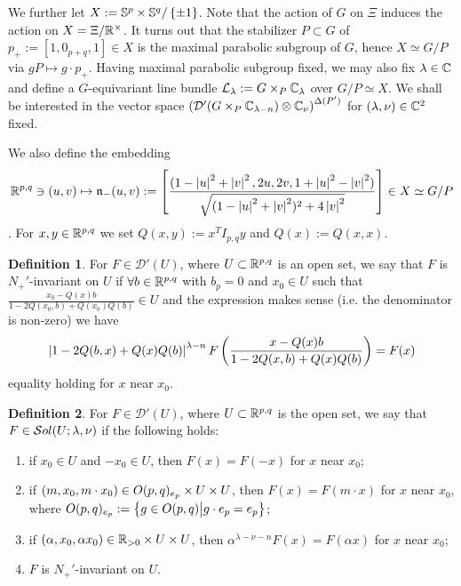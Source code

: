 \documentclass[10pt]{article} %
\newcommand{\D}{\mathcal{D}}
\theoremstyle{definition}
\newtheorem{mydef}{Definition}[section]
\theoremstyle{remark}
\newtheorem*{remark}{Remark}
\begin{document}
We further let $X:=\Sp^p\times\Sp^q/\left\{ \pm1 \right\}$. Note that the action of $G$
on $\Xi$ induces the action on $X=\Xi/\R^\times$. It turns out that the stabilizer $P\subset G$ of $p_+:=[1,0_{p+q},1]\in X$
is the maximal parabolic subgroup of $G$, hence $X\simeq G/P$ via $gP\mapsto g\cdot p_+$. Having maximal parabolic subgroup
fixed, we may also fix $\lambda\in\C$ and define a $G$-equivariant line bundle
$\mathcal{L}_{\lambda}:=G\times_P\C_\lambda$ over $G/P\simeq X$. We shall be interested
in the vector space $\mybra{\D'(G\times_P\C_{\lambda-n} )\otimes\C_\nu}^{\Delta(P')}$ for $(\lambda,\nu)\in\C^2$ fixed.

We also define the embedding \[\R^{ p,q }\ni(u,v)\mapsto \mathfrak{n}_-(u,v):=\mysbra{\frac{
	(1-\myabs{ u }^2+\myabs{ v }^2,2u,2v,1+\myabs{ u }^2
-\myabs{ v }^2)}{\sqrt{(1-\myabs{u}^2+\myabs{v}^2)^2+4\myabs{v}^2}}}\in X\simeq G/P\].
	For $x,y\in\R^{ p,q }$
	we set $Q(x,y):=x^TI_{ p,q }y$ and $Q(x):=Q(x,x)$.
\begin{mydef}
 For $F\in\D'(U)$, where $U\subset\R^{ p,q }$ is an open set, we say that
	$F$ is $N_+'$-invariant on $U$ if 
	$\forall b\in\R^{ p,q }$ with $b_p=0$ and $x_0\in U$ such that
	$\frac{ x_0-Q(x)b }{ 1-2Q(x_0,b)+Q(x_0)Q(b) }\in U$ and the expression makes sense (i.e. 
	the denominator is non-zero) we have \[\myabs{ 1-2Q(b,x)+Q(x)Q(b) }^{ \lambda-n }F
	\mybra{\frac{ x-Q(x)b }{ 1-2Q(x,b)+Q(x)Q(b)}}=F(x)\] equality holding for $x$ near $x_0$.
\end{mydef}
\begin{mydef}
		 For $F\in\D'(U)$, where $U\subset\R^{ p,q }$ is the open set,
			we say that $F\in\sol[U]$ if the following holds:
			\begin{enumerate}
				\item if $x_0\in U$ and $-x_0\in U$, then $F(x)=F(-x)$ for $x$ near $x_0$;
				\item if $(m,x_0,m\cdot x_0)\in \Stab\times U\times U$, then $F(x)=F(m\cdot x)$ for
					$x$ near $x_0$, where $\Stab:=\mysetn{g\in O(p,q)}{g\cdot e_p=e_p}$;
				\item if $(\alpha,x_0,\alpha x_0)\in \R_{>0}\times U\times U$, then $\alpha^{
					\lambda-\nu-n}F(x)=F(\alpha x)$ for $x$ near $x_0$;
				\item $F$ is $N_+'$-invariant on $U$.
			\end{enumerate}
\end{mydef}
\end{document}
